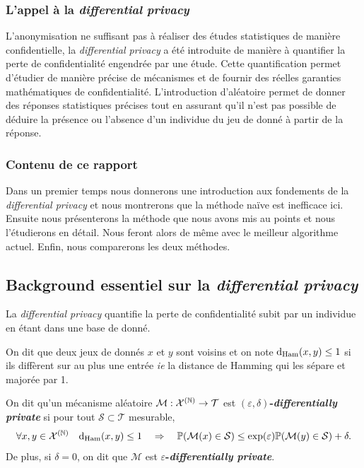 \subsubsection{L'appel à la \textit{differential privacy}}

L'anonymisation ne suffisant pas à réaliser des études statistiques de manière confidentielle, la \textit{differential privacy} a été introduite de manière à quantifier la perte de confidentialité engendrée par une étude. Cette quantification permet d'étudier de manière précise de mécanismes et de fournir des réelles garanties mathématiques de confidentialité. L'introduction d'aléatoire permet de donner des réponses statistiques précises tout en assurant qu'il n'est pas possible de déduire la présence ou l'absence d'un individue du jeu de donné à partir de la réponse.

\subsubsection{Contenu de ce rapport}

Dans un premier temps nous donnerons une introduction aux fondements de la \textit{differential privacy} et nous montrerons que la méthode naïve est inefficace ici. Ensuite nous présenterons la méthode que nous avons mis au points et nous l'étudierons en détail. Nous feront alors de même avec le meilleur algorithme actuel. Enfin, nous comparerons les deux méthodes.

\subsection{Background essentiel sur la \textit{differential privacy}}

La \textit{differential privacy} \cite{10.1007/11681878_14} quantifie la perte de confidentialité subit par un individue en étant dans une base de donné. \\


On dit que deux jeux de donnés \(x\) et \(y\) sont voisins et on note \(\mathrm{d}_{\text{Ham}}(x,y) \leq 1\) si ils diffèrent sur au plus une entrée \textit{ie} la distance de {\sc Hamming} qui les sépare et majorée par 1.\\


On dit qu'un mécanisme aléatoire \(\mathcal M :\mathcal X^{(\mathbb{N})} \to \mathcal T\) est \textbf{\((\varepsilon, \delta)\)-\textit{differentially private}} si pour tout \(\mathcal S \subset \mathcal T \) mesurable, 
\[
    \forall x,y \in \mathcal X^{(\mathbb{N})} \quad \mathrm{d}_{\text{Ham}}(x,y) \leq 1 \quad \Rightarrow \quad \mathbb P(\mathcal M(x) \in \mathcal S) \leq \exp(\varepsilon)  \mathbb P(\mathcal M(y) \in \mathcal S) + \delta.
\] 
De plus, si \(\delta = 0\), on dit que \(\mathcal M\) est \textbf{\(\varepsilon\)-\textit{differentially private}}.\\


